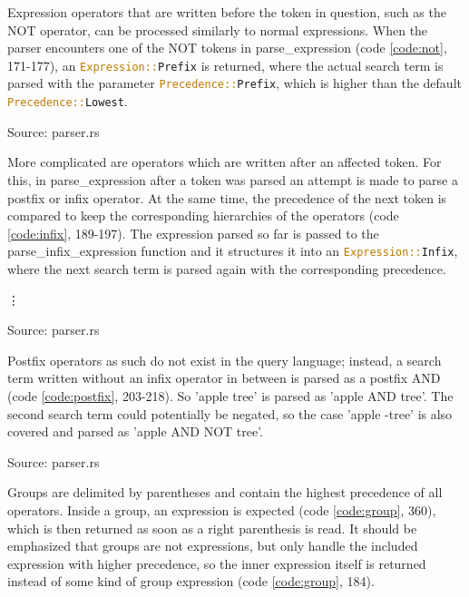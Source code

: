 Expression operators that are written before the token in question, such as the NOT operator, can be processed similarly to normal expressions. When the parser encounters one of the NOT tokens in parse\_expression (code \ref{code:not}, 171-177), an \lstinline[language=Rust]$Expression::Prefix$ is returned, where the actual search term is parsed with the parameter \lstinline[language=Rust]$Precedence::Prefix$, which is higher than the default \lstinline[language=Rust]$Precedence::Lowest$.
\begin{codeenv}
    \label{code:not}
    
    \centerline{Source: parser.rs}
\end{codeenv}
More complicated are operators which are written after an affected token. For this, in parse\_expression after a token was parsed an attempt is made to parse a postfix or infix operator. At the same time, the precedence of the next token is compared to keep the corresponding hierarchies of the operators (code \ref{code:infix}, 189-197). The expression parsed so far is passed to the parse\_infix\_expression function and it structures it into an \lstinline[language=Rust]$Expression::Infix$, where the next search term is parsed again with the corresponding precedence.
\begin{codeenv}
    \label{code:infix}
    
    \vdots
    
    \centerline{Source: parser.rs}
\end{codeenv}
Postfix operators as such do not exist in the query language; instead, a search term written without an infix operator in between is parsed as a postfix AND (code \ref{code:postfix}, 203-218). So 'apple tree' is parsed as 'apple AND tree'. The second search term could potentially be negated, so the case 'apple -tree' is also covered and parsed as 'apple AND NOT tree'.
\begin{codeenv}
    \label{code:postfix}
    
    \centerline{Source: parser.rs}
\end{codeenv}
Groups are delimited by parentheses and contain the highest precedence of all operators. Inside a group, an expression is expected (code \ref{code:group}, 360), which is then returned as soon as a right parenthesis is read. It should be emphasized that groups are not expressions, but only handle the included expression with higher precedence, so the inner expression itself is returned instead of some kind of group expression (code \ref{code:group}, 184).
